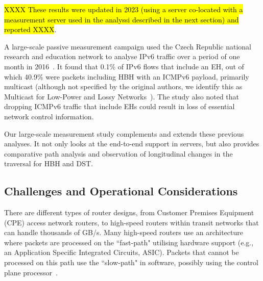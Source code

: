 \documentclass[conference]{IEEEtran}
\begin{document}
\hl{XXXX These results were updated in 2023 (using a server co-located with a measurement server used in the analyssi described in the next section) and reported XXXX}.


A large-scale passive measurement campaign used the Czech Republic national
research and education network to analyse IPv6 traffic over a period of one month in
2016~\cite{passive-threats}. It found that 0.1\% of IPv6 flows
that include an EH, out of which 40.9\% were packets including HBH with an ICMPv6
payload, primarily multicast (although not specified by the original authors,
we identify this as Multicast for Low-Power and Lossy Networks~\cite{RFC7731}).
The study also noted that dropping ICMPv6 traffic that include EHs could result in
loss of essential network control information. 


Our large-scale measurement study complements and extends these previous analyses. It not only
looks at the end-to-end support in servers, but also provides comparative path
analysis and observation of longitudinal changes in the traversal for HBH and DST.

\subsection{Challenges and Operational Considerations}

There are different types of router designs, from Customer Premises Equipment (CPE) access network routers, to high-speed routers within transit networks that can handle thousands of GB/s. Many high-speed routers  use an architecture where packets are processed on the ``fast-path" utilising hardware support (e.g., an Application Specific Integrated Circuits, ASIC). Packets that cannot be processed on this path use the ``slow-path" in software, possibly using the control plane processor~\cite{RFC3654}. 
\end{document}

